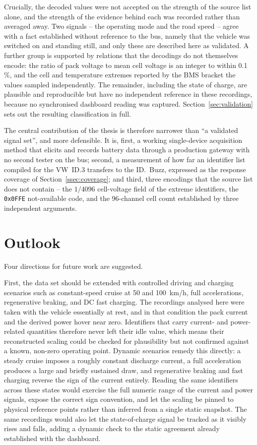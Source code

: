 \documentclass[11pt,a4paper,oneside,parskip=half]{scrreprt}
\providecommand{\hex}{}\renewcommand{\hex}[1]{\texttt{0x#1}}
\begin{document}
Crucially, the decoded values were not accepted on the strength of the source list alone, and the strength of the evidence behind each was recorded rather than averaged away. Two signals -- the operating mode and the road speed -- agree with a fact established without reference to the bus, namely that the vehicle was switched on and standing still, and only these are described here as validated. A further group is supported by relations that the decodings do not themselves encode: the ratio of pack voltage to mean cell voltage is an integer to within 0.1\,\%, and the cell and temperature extremes reported by the BMS bracket the values sampled independently. The remainder, including the state of charge, are plausible and reproducible but have no independent reference in these recordings, because no synchronised dashboard reading was captured. Section~\ref{sec:validation} sets out the resulting classification in full.

The central contribution of the thesis is therefore narrower than ``a validated signal set'', and more defensible. It is, first, a working single-device acquisition method that elicits and records battery data through a production gateway with no second tester on the bus; second, a measurement of how far an identifier list compiled for the VW~ID.3 transfers to the ID.~Buzz, expressed as the response coverage of Section~\ref{ssec:coverage}; and third, three encodings that the source list does not contain -- the $1/4096$ cell-voltage field of the extreme identifiers, the \hex{0FFE} not-available code, and the 96-channel cell count established by three independent arguments.

\section{Outlook}
\label{sec:outlook}
Four directions for future work are suggested.

First, the data set should be extended with controlled driving and charging scenarios such as constant-speed cruise at 50 and 100~km/h, full accelerations, regenerative braking, and DC fast charging. The recordings analysed here were taken with the vehicle essentially at rest, and in that condition the pack current and the derived power hover near zero. Identifiers that carry current- and power-related quantities therefore never left their idle value, which means their reconstructed scaling could be checked for plausibility but not confirmed against a known, non-zero operating point. Dynamic scenarios remedy this directly: a steady cruise imposes a roughly constant discharge current, a full acceleration produces a large and briefly sustained draw, and regenerative braking and fast charging reverse the sign of the current entirely. Reading the same identifiers across these states would exercise the full numeric range of the current and power signals, expose the correct sign convention, and let the scaling be pinned to physical reference points rather than inferred from a single static snapshot. The same recordings would also let the state-of-charge signal be tracked as it visibly rises and falls, adding a dynamic check to the static agreement already established with the dashboard.
\end{document}
